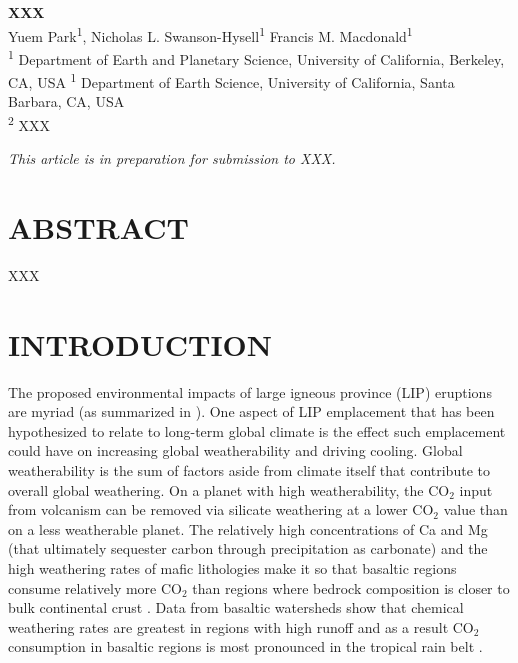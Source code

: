 \documentclass[11pt,letterpaper]{article}
\begin{document}
\begin{flushleft}
{\Large \textbf{XXX}}
\\
Yuem Park\textsuperscript{1},
Nicholas L. Swanson-Hysell\textsuperscript{1}
Francis M. Macdonald\textsuperscript{1}
\\
\bigskip
\textsuperscript{1} Department of Earth and Planetary Science, University of California, Berkeley, CA, USA
\textsuperscript{1} Department of Earth Science, University of California, Santa Barbara, CA, USA
\\
\textsuperscript{2} XXX
\bigskip

\end{flushleft}

\noindent\textit{This article is in preparation for submission to XXX.}

\linenumbers

\section*{ABSTRACT \label{sec:ABSTRACT}}

XXX

\section*{INTRODUCTION \label{sec:INTRODUCTION}}

The proposed environmental impacts of large igneous province (LIP) eruptions are myriad (as summarized in \citealp{Ernst2017}). One aspect of LIP emplacement that has been hypothesized to relate to long-term global climate is the effect such emplacement could have on increasing global weatherability and driving cooling. Global weatherability is the sum of factors aside from climate itself that contribute to overall global weathering. On a planet with high weatherability, the CO$_2$ input from volcanism can be removed via silicate weathering at a lower CO$_2$ value than on a less weatherable planet. The relatively high concentrations of Ca and Mg (that ultimately sequester carbon through precipitation as carbonate) and the high weathering rates of mafic lithologies make it so that basaltic regions consume relatively more CO$_2$ than regions where bedrock composition is closer to bulk continental crust \citep{Dessert2003a}. Data from basaltic watersheds show that chemical weathering rates are greatest in regions with high runoff and as a result CO$_2$ consumption in basaltic regions is most pronounced in the tropical rain belt \citep{Dessert2003a, Hartmann2014a}.
\end{document}
